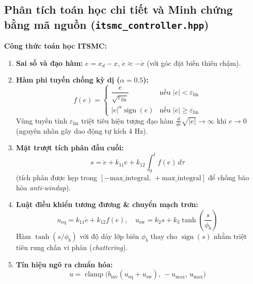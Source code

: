 \documentclass[11pt,a4paper]{article}
\begin{document}
\subsection{Phân tích toán học chi tiết và Minh chứng bằng mã nguồn (\texttt{itsmc\_controller.hpp})}
\noindent
\begin{minipage}[t]{0.45\textwidth}
\vspace{0pt}
\textbf{Công thức toán học ITSMC:}
\begin{enumerate}[leftmargin=1.3em, itemsep=0.25em]
    \item \textbf{Sai số và đạo hàm:} $e = x_d - x$, $\dot{e} \approx -\dot{x}$ (với góc đặt biến thiên chậm).
    \item \textbf{Hàm phi tuyến chống kỳ dị ($\alpha = 0.5$):}
    \[
    f(e) = \begin{cases}
        \dfrac{e}{\sqrt{\varepsilon_{\text{lin}}}} & \text{nếu } |e| < \varepsilon_{\text{lin}} \\[6pt]
        |e|^\alpha \operatorname{sign}(e) & \text{nếu } |e| \ge \varepsilon_{\text{lin}}
    \end{cases}
    \]
    Vùng tuyến tính $\varepsilon_{\text{lin}}$ triệt tiêu hiện tượng đạo hàm $\frac{d}{de}\sqrt{|e|} \to \infty$ khi $e \to 0$ (nguyên nhân gây dao động tự kích 4 Hz).
    \item \textbf{Mặt trượt tích phân đầu cuối:}
    \[
    s = \dot{e} + k_{11} e + k_{12} \int_0^t f(e)\,d\tau
    \]
    (tích phân được kẹp trong $[-\text{max\_integral},\, +\text{max\_integral}]$ để chống bão hòa \emph{anti-windup}).
    \item \textbf{Luật điều khiển tương đương \& chuyển mạch trơn:}
    \[
    u_{\text{eq}} = k_{11}\dot{e} + k_{12} f(e), \quad u_{\text{sw}} = k_2 s + k_3 \tanh\!\left(\frac{s}{\phi_b}\right)
    \]
    Hàm $\tanh(s/\phi_b)$ với độ dày lớp biên $\phi_b$ thay cho $\operatorname{sign}(s)$ nhằm triệt tiêu rung chấn vi phân (\emph{chattering}).
    \item \textbf{Tín hiệu ngõ ra chuẩn hóa:}
    \[
    u = \operatorname{clamp}\!\big(b_{\text{inv}}(u_{\text{eq}} + u_{\text{sw}}),\, -u_{\max},\, u_{\max}\big)
    \]
\end{enumerate}
\end{minipage}
\hfill
\end{document}
